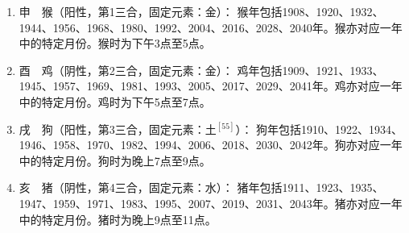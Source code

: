 \begin{enumerate}
\item 申　猴（阳性，第1三合，固定元素：金）：  
猴年包括1908、1920、1932、1944、1956、1968、1980、1992、2004、2016、2028、2040年。猴亦对应一年中的特定月份。猴时为下午3点至5点。
\item 酉　鸡（阴性，第2三合，固定元素：金）：  
鸡年包括1909、1921、1933、1945、1957、1969、1981、1993、2005、2017、2029、2041年。鸡亦对应一年中的特定月份。鸡时为下午5点至7点。
\item 戌　狗（阳性，第3三合，固定元素：土$^{[55]}$）：  
狗年包括1910、1922、1934、1946、1958、1970、1982、1994、2006、2018、2030、2042年。狗亦对应一年中的特定月份。狗时为晚上7点至9点。
\item 亥　猪（阴性，第4三合，固定元素：水）：  
猪年包括1911、1923、1935、1947、1959、1971、1983、1995、2007、2019、2031、2043年。猪亦对应一年中的特定月份。猪时为晚上9点至11点。
\end{enumerate}